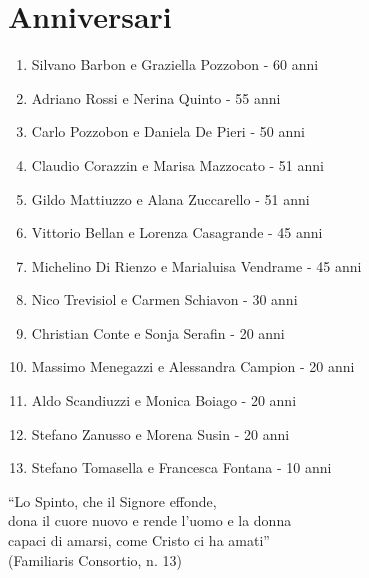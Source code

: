 \section{Anniversari}

\begin{enumerate}
  \item Silvano Barbon e Graziella Pozzobon - 60 anni
  \item Adriano Rossi e Nerina Quinto - 55 anni
  \item Carlo Pozzobon e Daniela De Pieri - 50 anni
  \item Claudio Corazzin e Marisa Mazzocato - 51 anni
  \item Gildo Mattiuzzo e Alana Zuccarello - 51 anni
  \item Vittorio Bellan e Lorenza Casagrande - 45 anni
  \item Michelino Di Rienzo e Marialuisa Vendrame - 45 anni
  \item Nico Trevisiol e Carmen Schiavon - 30 anni
  \item Christian Conte e Sonja Serafin - 20 anni
  \item Massimo Menegazzi e Alessandra Campion - 20 anni
  \item Aldo Scandiuzzi e Monica Boiago - 20 anni
  \item Stefano Zanusso e Morena Susin - 20 anni
  \item Stefano Tomasella e Francesca Fontana - 10 anni
\end{enumerate}

``Lo Spinto, che il Signore effonde,\\
dona il cuore nuovo e rende l'uomo e la donna\\
capaci di amarsi, come Cristo ci ha amati''\\
(Familiaris Consortio, n. 13)
